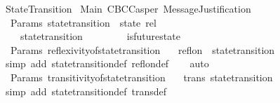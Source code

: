 %
\begin{isabellebody}%
%
%
\isadelimtheory
%
\endisadelimtheory
%
\isatagtheory
{}\isamarkupfalse%
\ StateTransition\isanewline
\isanewline
{}\ Main\ CBCCasper\ MessageJustification\isanewline
\isanewline
{}%
\endisatagtheory
{\isafoldtheory}%
%
\isadelimtheory
\isanewline
%
\endisadelimtheory
\isanewline
{}\isamarkupfalse%
\ {\isacharparenleft}\ Params{\isacharparenright}\ state{\isacharunderscore}transition\ {\isacharcolon}{\isacharcolon}\ {\isachardoublequoteopen}state\ rel{\isachardoublequoteclose}\isanewline
\ \ \ \isanewline
\ \ \ \ {\isachardoublequoteopen}state{\isacharunderscore}transition\ {\isacharequal}\ {\isacharbraceleft}{\isacharparenleft}{\isasymsigma}{}{\isacharcomma}\ {\isasymsigma}{}{\isacharparenright}{\isachardot}\ {\isacharbraceleft}{\isasymsigma}{}{\isacharcomma}\ {\isasymsigma}{}{\isacharbraceright}\ {\isasymsubseteq}\ {\isasymSigma}\ {\isasymand}\ is{\isacharunderscore}future{\isacharunderscore}state{\isacharparenleft}{\isasymsigma}{}{\isacharcomma}\ {\isasymsigma}{}{\isacharparenright}{\isacharbraceright}{\isachardoublequoteclose}\ \isanewline
\isanewline
{}\isamarkupfalse%
\ {\isacharparenleft}\ Params{\isacharparenright}\ reflexivity{\isacharunderscore}of{\isacharunderscore}state{\isacharunderscore}transition\ {\isacharcolon}\isanewline
\ \ {\isachardoublequoteopen}refl{\isacharunderscore}on\ {\isasymSigma}\ state{\isacharunderscore}transition{\isachardoublequoteclose}\ \ \isanewline
%
\isadelimproof
\ \ %
\endisadelimproof
%
\isatagproof
{}\isamarkupfalse%
\ {\isacharparenleft}simp\ add{\isacharcolon}\ state{\isacharunderscore}transition{\isacharunderscore}def\ refl{\isacharunderscore}on{\isacharunderscore}def{\isacharparenright}\isanewline
\ \ \isamarkupfalse%
\ auto%
\endisatagproof
{\isafoldproof}%
%
\isadelimproof
\isanewline
%
\endisadelimproof
\isanewline
{}\isamarkupfalse%
\ {\isacharparenleft}\ Params{\isacharparenright}\ transitivity{\isacharunderscore}of{\isacharunderscore}state{\isacharunderscore}transition\ {\isacharcolon}\isanewline
\ \ {\isachardoublequoteopen}trans\ state{\isacharunderscore}transition{\isachardoublequoteclose}\ \ \isanewline
%
\isadelimproof
\ \ %
\endisadelimproof
%
\isatagproof
{}\isamarkupfalse%
\ {\isacharparenleft}simp\ add{\isacharcolon}\ state{\isacharunderscore}transition{\isacharunderscore}def\ trans{\isacharunderscore}def{\isacharparenright}\isanewline

\end{isabellebody}
